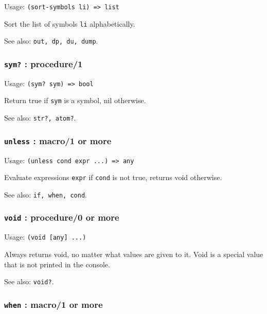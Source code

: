 \documentclass[
]{article}
\newcommand{\passthrough}[1]{#1}
\begin{document}
Usage: \passthrough{\lstinline!(sort-symbols li) => list!}

Sort the list of symbols \passthrough{\lstinline!li!} alphabetically.

See also: \passthrough{\lstinline!out, dp, du, dump!}.

\hypertarget{sym-procedure1}{%
\subsubsection{\texorpdfstring{\texttt{sym?} :
procedure/1}{sym? : procedure/1}}\label{sym-procedure1}}

Usage: \passthrough{\lstinline!(sym? sym) => bool!}

Return true if \passthrough{\lstinline!sym!} is a symbol, nil otherwise.

See also: \passthrough{\lstinline!str?, atom?!}.

\hypertarget{unless-macro1-or-more}{%
\subsubsection{\texorpdfstring{\texttt{unless} : macro/1 or
more}{unless : macro/1 or more}}\label{unless-macro1-or-more}}

Usage: \passthrough{\lstinline!(unless cond expr ...) => any!}

Evaluate expressions \passthrough{\lstinline!expr!} if
\passthrough{\lstinline!cond!} is not true, returns void otherwise.

See also: \passthrough{\lstinline!if, when, cond!}.

\hypertarget{void-procedure0-or-more}{%
\subsubsection{\texorpdfstring{\texttt{void} : procedure/0 or
more}{void : procedure/0 or more}}\label{void-procedure0-or-more}}

Usage: \passthrough{\lstinline!(void [any] ...)!}

Always returns void, no matter what values are given to it. Void is a
special value that is not printed in the console.

See also: \passthrough{\lstinline!void?!}.

\hypertarget{when-macro1-or-more}{%
\subsubsection{\texorpdfstring{\texttt{when} : macro/1 or
more}{when : macro/1 or more}}\label{when-macro1-or-more}}
\end{document}
